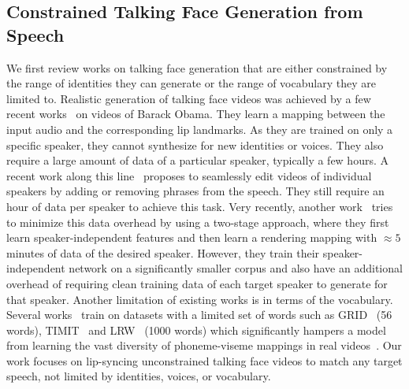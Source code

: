 \documentclass[sigconf]{acmart}
\begin{document}
\subsection{Constrained Talking Face Generation from Speech}
We first review works on talking face generation that are either constrained by the range of identities they can generate or the range of vocabulary they are limited to. Realistic generation of talking face videos was achieved by a few recent works~\cite{suwajanakorn2017synthesizing,kumar2017obamanet} on videos of Barack Obama. They learn a mapping between the input audio and the corresponding lip landmarks. As they are trained on only a specific speaker, they cannot synthesize for new identities or voices. They also require a large amount of data of a particular speaker, typically a few hours. A recent work along this line~\cite{fried2019text} proposes to seamlessly edit videos of individual speakers by adding or removing phrases from the speech. They still require an hour of data per speaker to achieve this task. Very recently, another work~\cite{thies2019neural} tries to minimize this data overhead by using a two-stage approach, where they first learn speaker-independent features and then learn a rendering mapping with $\approx5$ minutes of data of the desired speaker. However, they train their speaker-independent network on a significantly smaller corpus and also have an additional overhead of requiring clean training data of each target speaker to generate for that speaker. Another limitation of existing works is in terms of the vocabulary. Several works~\cite{zhou2018talking,vougioukas2019realistic,chen2019hierarchical} train on datasets with a limited set of words such as GRID~\cite{cooke2006audio} (56 words), TIMIT~\cite{harte2015tcd} and LRW~\cite{chung2016lip} (1000 words) which significantly hampers a model from learning the vast diversity of phoneme-viseme mappings in real videos~\cite{kr2019towards}. Our work focuses on lip-syncing unconstrained talking face videos to match any target speech, not limited by identities, voices, or vocabulary.
\end{document}
